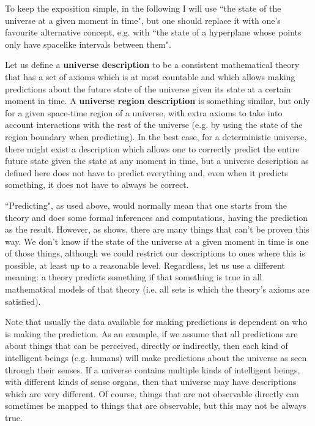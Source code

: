 \documentclass[a4paper
,draft
]{article}
\newcommand{\definitie}[1]{\textbf{#1}}
\newcommand{\ghilimele}[1]{``#1"}
\begin{document}
To keep the exposition simple, in the following I will use
\ghilimele{the state of the universe at a given moment in time},
but one should replace it with one's favourite alternative concept, e.g.
with \ghilimele{the state of a hyperplane whose points only have spacelike
intervals between them}.

Let us define a \definitie{universe description} to be a
consistent mathematical theory that has
a set of axioms which is at most countable and which allows making
predictions about the future state of the universe given its state
at a certain moment in time. A \definitie{universe region description}
is something similar, but only for a given space-time region of a universe,
with extra axioms to take into account interactions with the rest of the
universe (e.g. by using the state of the region boundary when predicting).
In the best case, for a deterministic universe, there might exist
a description which allows one to correctly predict the entire future state
given the state at any moment in time, but a universe description
as defined here does not have to predict everything and,
even when it predicts something, it does not have to always be correct.

\ghilimele{Predicting}, as used above, would normally mean that one
starts from the theory and does some formal inferences and computations, having
the prediction as the result.
However, as \cite{Calude2013} shows, there are many
things that can't be proven this way.
We don't know if the state of the universe at a given moment in time is one of
those things, although we could restrict our descriptions to ones where this
is possible, at least up to a reasonable level.
Regardless, let us use a different meaning: a theory predicts something if
that something is true in all mathematical models of that theory (i.e. all
sets is which the theory's axioms are satisfied).

Note that usually the data available for making predictions is dependent
on who is making the prediction. As an example, if we assume that
all predictions are about things that can be perceived, directly or indirectly,
then
each kind of intelligent beings (e.g. humans) will make predictions
about the universe as seen through their senses. If a universe contains
multiple kinds of intelligent beings, with different kinds of
sense organs, then that universe may have descriptions which are
very different.
Of course, things that are not observable directly can sometimes be mapped
to things that are observable, but this may not be always true.
\end{document}
